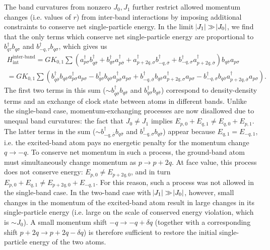 \documentclass[aps,notitlepage,nofootinbib,11pt]{revtex4-1}
\renewcommand{\t}{\text} %
\newcommand{\p}[1]{\left(#1\right)} %
\newcommand{\1}{\mathds{1}}
\begin{document}
The band curvatures from nonzero $J_0,J_1$ further restrict allowed
momentum changes (i.e. values of $r$) from inter-band interactions by
imposing additional constraints to conserve net single-particle
energy.  In the limit $\abs{J_1}\gg\abs{J_0}$, we find that the only
terms which conserve net single-particle energy are proportional to
$b_{q\tau}^\dag b_{q\sigma}$ and $b_{-q,\tau}^\dag b_{q\sigma}$, which
gives us
\begin{multline}
  H_{\t{int}}^{\t{inter-band}}
  = G K_{0,1} \sum
  \p{a_{p\sigma}^\dag b_{q\bar\sigma}^\dag
    + b_{q\sigma}^\dag a_{p\bar\sigma}^\dag
    + a_{p+2q,\sigma}^\dag b_{-q,\bar\sigma}^\dag
    + b_{-q,\sigma}^\dag a_{p+2q,\bar\sigma}^\dag}
  b_{q\bar\sigma} a_{p\sigma} \\
  = G K_{0,1} \sum
  \p{b_{q\bar\sigma}^\dag b_{q\bar\sigma} a_{p\sigma}^\dag a_{p\sigma}
    - b_{q\sigma}^\dag b_{q\bar\sigma} a_{p\bar\sigma}^\dag a_{p\sigma}
    + b_{-q,\bar\sigma}^\dag b_{q\bar\sigma} a_{p+2q,\sigma}^\dag a_{p\sigma}
    - b_{-q,\sigma}^\dag b_{q\bar\sigma} a_{p+2q,\bar\sigma}^\dag a_{p\sigma}}.
\end{multline}
The first two terms in this sum
($\sim b_{q\bar\sigma}^\dag b_{q\bar\sigma}$ and
$b_{q\sigma}^\dag b_{q\bar\sigma}$) correspond to density-density
terms and an exchange of clock state between atoms in different bands.
Unlike the single-band case, momentum-exchanging processes are now
disallowed due to unequal band curvatures: the fact that $J_0\ne J_1$
implies $E_{p,0}+E_{q,1}\ne E_{q,0}+E_{p,1}$.  The latter terms in the
sum ($\sim b_{-q,\bar\sigma}^\dag b_{q\bar\sigma}$ and
$b_{-q,\sigma}^\dag b_{q\bar\sigma}$) appear because
$E_{q,1}=E_{-q,1}$, i.e. the excited-band atom pays no energetic
penalty for the momentum change $q\to-q$.  To conserve net momentum in
such a process, the ground-band atom must simultaneously change
momentum as $p\to p+2q$.  At face value, this process does not
conserve energy: $E_{p,0}\ne E_{p+2q,0}$, and in turn
$E_{p,0}+E_{q,1}\ne E_{p+2q,0}+E_{-q,1}$.  For this reason, such a
process was not allowed in the single-band case.  In the two-band case
with $\abs{J_1}\gg\abs{J_0}$, however, small changes in the momentum
of the excited-band atom result in large changes in its
single-particle energy (i.e. large on the scale of conserved energy
violation, which is $\sim J_0$).  A small momentum shift
$-q\to-q+\delta q$ (together with a corresponding shift
$p+2q\to p+2q-\delta q$) is therefore sufficient to restore the
initial single-particle energy of the two atoms.
\end{document}
